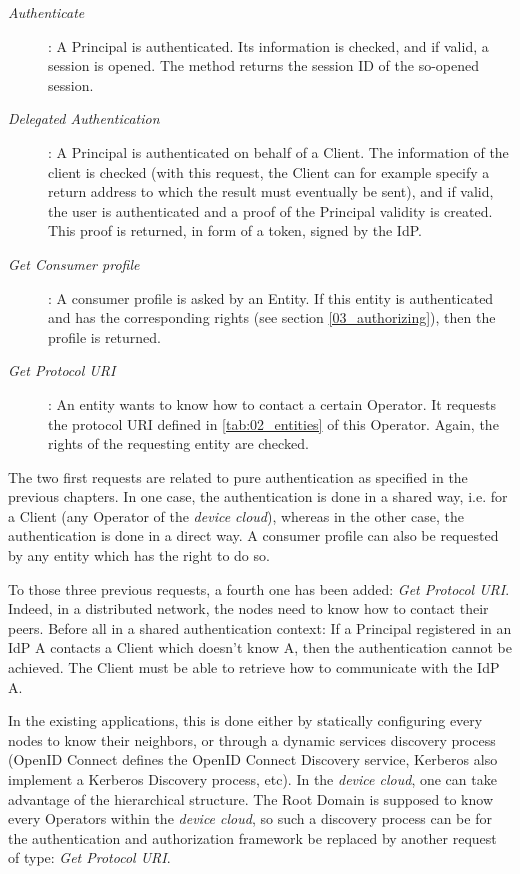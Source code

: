 \begin{description}
	\item[\textit{Authenticate}]: A Principal is authenticated. Its information is checked, and if valid, a session is opened. The method returns the session ID of the so-opened session.
	\item[\textit{Delegated Authentication}]: A Principal is authenticated on behalf of a Client. The information of the client is checked (with this request, the Client can for example specify a return address to which the result must eventually be sent), and if valid, the user is authenticated and a proof of the Principal validity is created. This proof is returned, in form of a token, signed by the IdP.
	\item[\textit{Get Consumer profile}]: A consumer profile is asked by an Entity. If this entity is authenticated and has the corresponding rights (see section \ref{03_authorizing}), then the profile is returned.
	\item[\textit{Get Protocol URI}]: An entity wants to know how to contact a certain Operator. It requests the protocol URI defined in \ref{tab:02_entities} of this Operator. Again, the rights of the requesting entity are checked.
\end{description}

The two first requests are related to pure authentication as specified in the previous chapters. In one case, the authentication is done in a shared way, i.e. for a Client (any Operator of the \emph{device cloud}), whereas in the other case, the authentication is done in a direct way. A consumer profile can also be requested by any entity which has the right to do so.

To those three previous requests, a fourth one has been added: \textit{Get Protocol URI}. Indeed, in a distributed network, the nodes need to know how to contact their peers. Before all in a shared authentication context: If a Principal registered in an IdP A contacts a Client which doesn't know A, then the authentication cannot be achieved. The Client must be able to retrieve how to communicate with the IdP A.

In the existing applications, this is done either by statically configuring every nodes to know their neighbors, or through a dynamic services discovery process (OpenID Connect defines the OpenID Connect Discovery service, Kerberos also implement a Kerberos Discovery process, etc). In the \emph{device cloud}, one can take advantage of the hierarchical structure. The Root Domain is supposed to know every Operators within the \emph{device cloud}, so such a discovery process can be for the authentication and authorization framework be replaced by another request of type: \textit{Get Protocol URI}.

